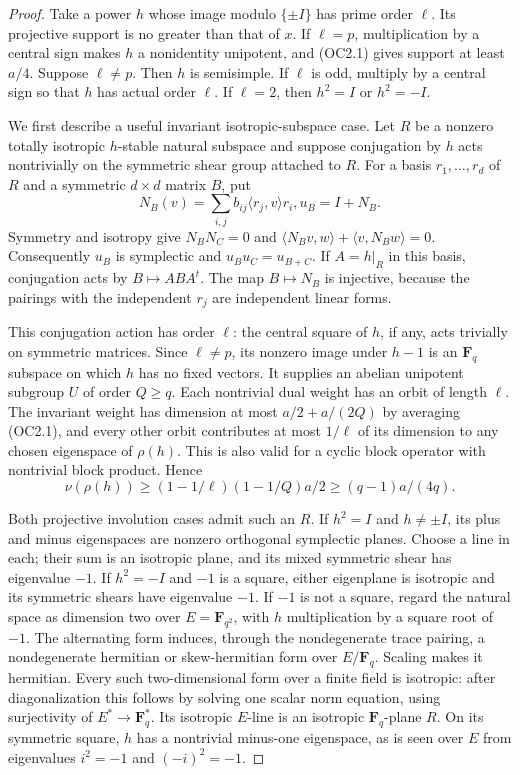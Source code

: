 \begin{proof}
Take a power $h$ whose image modulo $\{\pm I\}$ has prime order
$\ell$. Its projective support is no greater than that of $x$.
If $\ell=p$, multiplication by a central sign makes $h$ a nonidentity
unipotent, and (OC2.1) gives support at least $a/4$. Suppose
$\ell\ne p$. Then $h$ is semisimple. If $\ell$ is odd, multiply
by a central sign so that $h$ has actual order $\ell$. If $\ell=2$,
then $h^2=I$ or $h^2=-I$.

We first describe a useful invariant isotropic-subspace case. Let
$R$ be a nonzero totally isotropic $h$-stable natural subspace and
suppose conjugation by $h$ acts nontrivially on the symmetric shear
group attached to $R$. For a basis $r_1,\ldots,r_d$ of $R$ and a
symmetric $d\times d$ matrix $B$, put
\[
 N_B(v)=\sum_{i,j}b_{ij}\langle r_j,v\rangle r_i,
                    u_B=I+N_B.                                \tag{OC2.6}
\]
Symmetry and isotropy give $N_BN_C=0$ and
$\langle N_Bv,w\rangle+\langle v,N_Bw\rangle=0$.
Consequently $u_B$ is symplectic and $u_Bu_C=u_{B+C}$.
If $A=h|_R$ in this basis, conjugation acts by $B\mapsto ABA^t$.
The map $B\mapsto N_B$ is injective, because the pairings with
the independent $r_j$ are independent linear forms.

This conjugation action has order $\ell$: the central square of
$h$, if any, acts trivially on symmetric matrices. Since
$\ell\ne p$, its nonzero image under $h-1$ is an $\mathbf F_q$
subspace on which $h$ has no fixed vectors. It supplies an abelian
unipotent subgroup $U$ of order $Q\ge q$. Each nontrivial dual
weight has an orbit of length $\ell$. The invariant weight has
dimension at most $a/2+a/(2Q)$ by averaging (OC2.1), and every
other orbit contributes at most $1/\ell$ of its dimension to any
chosen eigenspace of $\rho(h)$. This is also valid for a cyclic
block operator with nontrivial block product. Hence
\[
 \nu(\rho(h))\ge(1-1/\ell)(1-1/Q)a/2
                    \ge(q-1)a/(4q).                          \tag{OC2.7}
\]

Both projective involution cases admit such an $R$. If $h^2=I$
and $h\ne\pm I$, its plus and minus eigenspaces are nonzero
orthogonal symplectic planes. Choose a line in each; their sum is
an isotropic plane, and its mixed symmetric shear has eigenvalue
$-1$. If $h^2=-I$ and $-1$ is a square, either eigenplane is
isotropic and its symmetric shears have eigenvalue $-1$. If
$-1$ is not a square, regard the natural space as dimension two
over $E=\mathbf F_{q^2}$, with $h$ multiplication by a square root
of $-1$. The alternating form induces, through the nondegenerate
trace pairing, a nondegenerate hermitian or skew-hermitian form
over $E/\mathbf F_q$. Scaling makes it hermitian. Every such
two-dimensional form over a finite field is isotropic: after
diagonalization this follows by solving one scalar norm equation,
using surjectivity of $E^*\to\mathbf F_q^*$. Its isotropic $E$-line
is an isotropic $\mathbf F_q$-plane $R$. On its symmetric square,
$h$ has a nontrivial minus-one eigenspace, as is seen over $E$
from eigenvalues $i^2=-1$ and $(-i)^2=-1$.


\end{proof}
